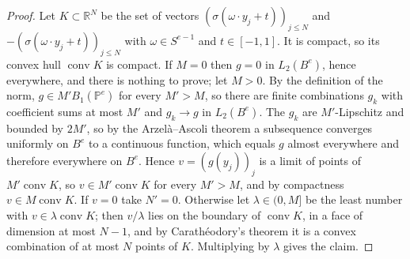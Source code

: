 \documentclass[11pt]{amsart}
\theoremstyle{definition}
\theoremstyle{remark}
\numberwithin{equation}{section}
\newcommand{\RR}{\mathbb{R}}
\newcommand{\cP}{\mathbb{P}}
\begin{document}
\begin{proof}
Let $K\subset\RR^N$ be the set of vectors $(\sigma(\omega\cdot y_j+t))_{j\le N}$ and $-(\sigma(\omega\cdot y_j+t))_{j\le N}$ with $\omega\in S^{e-1}$ and $t\in[-1,1]$. It is compact, so its convex hull $\operatorname{conv}K$ is compact. If $M=0$ then $g=0$ in $L_2(B^e)$, hence everywhere, and there is nothing to prove; let $M>0$. By the definition of the norm, $g\in M'B_1(\cP^e)$ for every $M'>M$, so there are finite combinations $g_k$ with coefficient sums at most $M'$ and $g_k\to g$ in $L_2(B^e)$. The $g_k$ are $M'$-Lipschitz and bounded by $2M'$, so by the Arzel\`a--Ascoli theorem a subsequence converges uniformly on $B^e$ to a continuous function, which equals $g$ almost everywhere and therefore everywhere on $B^e$. Hence $v=(g(y_j))_j$ is a limit of points of $M'\operatorname{conv}K$, so $v\in M'\operatorname{conv}K$ for every $M'>M$, and by compactness $v\in M\operatorname{conv}K$. If $v=0$ take $N'=0$. Otherwise let $\lambda\in(0,M]$ be the least number with $v\in\lambda\operatorname{conv}K$; then $v/\lambda$ lies on the boundary of $\operatorname{conv}K$, in a face of dimension at most $N-1$, and by Carath\'eodory's theorem it is a convex combination of at most $N$ points of $K$. Multiplying by $\lambda$ gives the claim.
\end{proof}
\end{document}
